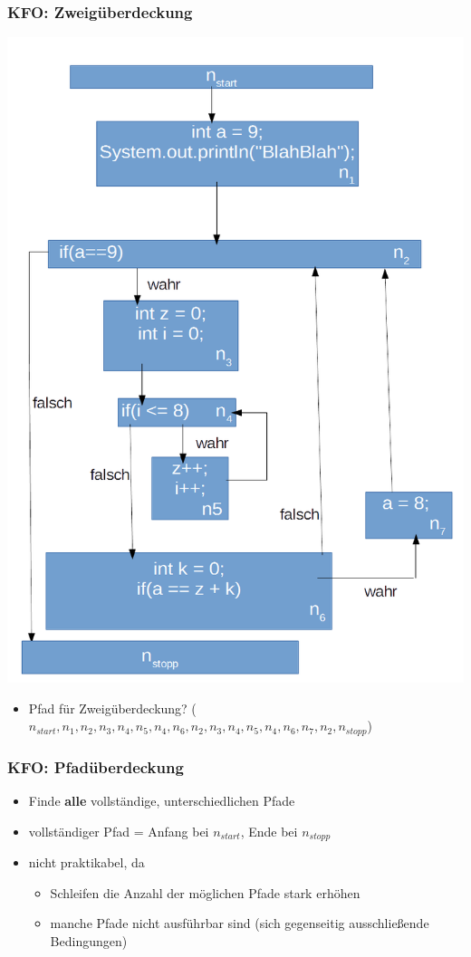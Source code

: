 \documentclass[18pt]{beamer}
\begin{document}
	\begin{frame}
		\frametitle{KFO: Zweigüberdeckung}
		\centering \includegraphics[scale=0.2]{./pics/tut5/test-without-goto.png}
		\begin{itemize}
			\item Pfad für Zweigüberdeckung? \pause ($n_{start}, n_1, n_2, n_3, n_4, n_5, n_4, n_6, n_2, n_3, n_4, n_5, n_4, n_6, n_7, n_2, n_{stopp}$) 
		\end{itemize}
	\end{frame}

	\begin{frame}
		\frametitle{KFO: Pfadüberdeckung}
		\begin{itemize}
			\item Finde \textbf{alle} vollständige, unterschiedlichen Pfade \pause
			\item vollständiger Pfad = Anfang bei $n_{start}$, Ende bei $n_{stopp}$ \pause
			\item nicht praktikabel, da 
			\begin{itemize}
				\item Schleifen die Anzahl der möglichen Pfade stark erhöhen \pause
				\item manche Pfade nicht ausführbar sind (sich gegenseitig ausschließende Bedingungen)
			\end{itemize}
		\end{itemize}
	\end{frame}
\end{document}
